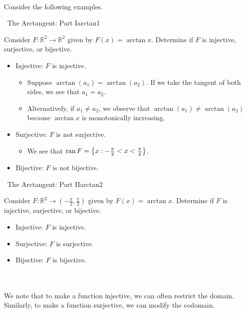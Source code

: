     \\
    Consider the following examples.
    \begin{example}{\Difficulty\,\Difficulty\,\,The Arctangent: Part I}{arctan1}
        
        Consider \(F:\mathbb{R}^2\to\mathbb{R}^2\) given by \(F(x)=\arctan x\). Determine if \(F\) is injective, surjective, or bijective.
        \begin{itemize}
            \item Injective: \(F\) is injective.
            \begin{itemize}
                \item Suppose \(\arctan(a_1)=\arctan(a_2)\). If we take the tangent of both sides, we see that \(a_1=a_2\).
                \item Alternatively, if \(a_1\neq a_2\), we observe that \(\arctan(a_1)\neq\arctan(a_2)\) because \(\arctan x\) is monotonically increasing.
            \end{itemize}
            \item Surjective: \(F\) is not surjective.
            \begin{itemize}
                \item We see that \(\text{ran\,} F=\left\{x:-\frac{\pi}{2}<x<\frac{\pi}{2}\right\}\).
            \end{itemize}
            \item Bijective: \(F\) is not bijective.
        \end{itemize}
    \end{example}
    \begin{example}{\Difficulty\,\Difficulty\,\,The Arctangent: Part II}{arctan2}
        
        Consider \(F:\mathbb{R}^2\to\left(-\frac{\pi}{2},\frac{\pi}{2}\right)\) given by \(F(x)=\arctan x\). Determine if \(F\) is injective, surjective, or bijective.
        \begin{itemize}
            \item Injective: \(F\) is injective.
            \item Surjective: \(F\) is surjective.
            \item Bijective: \(F\) is bijective.
        \end{itemize}
    
    \end{example}
    \vphantom
    \\
    \\
    We note that to make a function injective, we can often restrict the domain. Similarly, to make a function surjective, we can modify the codomain.
    
